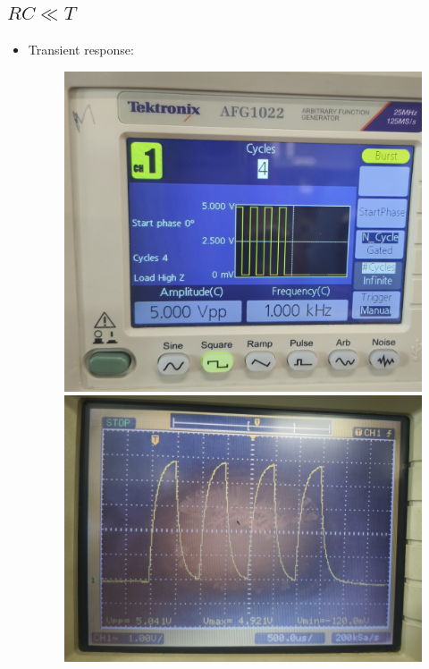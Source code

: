\documentclass[12pt,a4paper]{report}
\begin{document}
\subsection{$RC \ll T$}
\begin{itemize}
    \item Transient response:
    \begin{figure}[H] %
    \centering
    \begin{minipage}[c]{0.48\textwidth}
        \includegraphics[width=\textwidth]{figs/t2.jpg} %
        
    \end{minipage}
    \hfill
    \begin{minipage}[c]{0.48\textwidth}
        \includegraphics[width=\textwidth]{figs/tr2.jpg} %
        

\end{minipage}
\end{figure}
\end{itemize}
\end{document}

